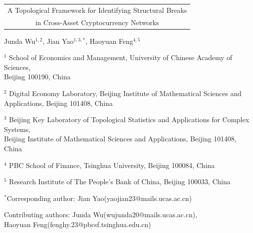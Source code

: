 \documentclass[11pt,reqno]{amsart}
\numberwithin{equation}{section} %
\begin{document}
\begin{center}

\vspace*{1em}

{\Large\bfseries 
\begin{tabular}{@{}c@{}}
A Topological Framework for Identifying Structural Breaks \\[0.4em] 
in Cross-Asset Cryptocurrency Networks
\end{tabular}
}

\vspace{2em}

{\large Junda Wu$^{1,2}$, Jian Yao$^{1,3,*}$, Haoyuan Feng$^{4,5}$}

\vspace{1em}

{\normalsize 
$^{1}$ School of Economics and Management, University of Chinese Academy of Sciences, \\ Beijing 100190, China}

\vspace{0.5em}

{\normalsize 
$^{2}$ Digital Economy Laboratory, Beijing Institute of Mathematical Sciences and Applications, Beijing 101408, China}

\vspace{0.5em}

{\normalsize 
$^{3}$ Beijing Key Laboratory of Topological Statistics and Applications for Complex Systems, \\
Beijing Institute of Mathematical Sciences and Applications, Beijing 101408, China}

{\normalsize 
$^{4}$ PBC School of Finance, Tsinghua University, Beijing 100084, China}

{\normalsize 
$^{5}$ Research Institute of The People’s Bank of China, Beijing 100033, China}
\vspace{1em}

{\normalsize $^*$Corresponding author: Jian Yao(yaojian23@mails.ucas.ac.cn)}

{\normalsize Contributing authors: Junda Wu(wujunda20@mails.ucas.ac.cn),\\
Haoyuan Feng(fenghy.23@pbcsf.tsinghua.edu.cn)}
\vspace{0.5em}
\end{center}
\end{document}
